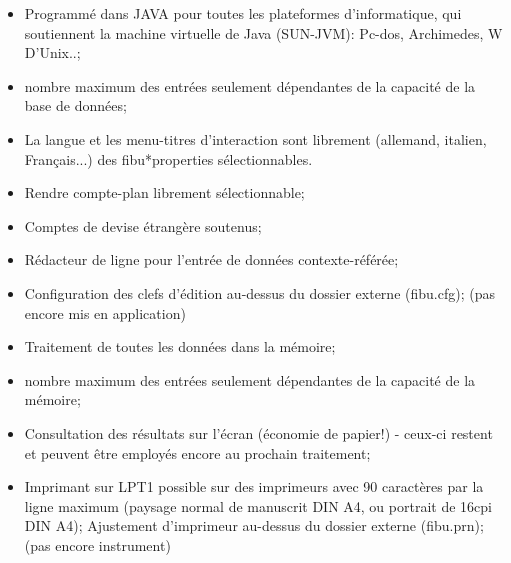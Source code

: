 \documentclass[12pt]{report}
\begin{document}
\begin{itemize}
\item Programmé dans JAVA pour toutes les plateformes d'informatique, qui soutiennent la machine virtuelle de Java (SUN-JVM):  Pc-dos, Archimedes, W D'Unix..;

\item nombre maximum des entrées seulement dépendantes de la capacité de la
base de données;


\item La langue et les menu-titres d'interaction sont librement (allemand, italien, Français...) des fibu*properties sélectionnables.



\item Rendre compte-plan librement sélectionnable;



\item Comptes de devise étrangère soutenus;



\item Rédacteur de ligne pour l'entrée de données contexte-référée;



\item Configuration des clefs d'édition au-dessus du dossier externe (fibu.cfg);  (pas encore mis en application)



\item Traitement de toutes les données dans la mémoire;



\item nombre maximum des entrées seulement dépendantes de la capacité de la mémoire;



\item Consultation des résultats sur l'écran (économie de papier!)  - ceux-ci restent et peuvent être employés encore au prochain traitement;



\item Imprimant sur LPT1 possible sur des imprimeurs avec 90 caractères par la ligne maximum (paysage normal de manuscrit DIN A4, ou portrait de 16cpi DIN A4);  Ajustement d'imprimeur au-dessus du dossier externe (fibu.prn);  (pas encore instrument)



\end{itemize}
\end{document}
